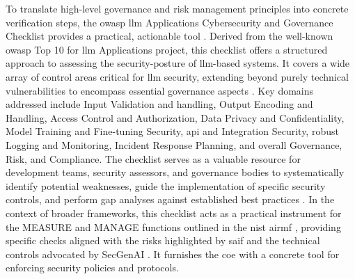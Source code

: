 To translate high-level governance and risk management principles into concrete verification steps, the \gls{owasp} \gls{llm} Applications Cybersecurity and Governance Checklist provides a practical, actionable tool \cite{editor_llm_nodate}. Derived from the well-known \gls{owasp} Top 10 for \gls{llm} Applications project, this checklist offers a structured approach to assessing the \gls{security-posture} of \gls{llm}-based systems. It covers a wide array of control areas critical for \gls{llm} security, extending beyond purely technical vulnerabilities to encompass essential governance aspects \cite{editor_llm_nodate}. Key domains addressed include Input Validation and handling, Output Encoding and Handling, Access Control and Authorization, Data Privacy and Confidentiality, Model Training and Fine-tuning Security, \gls{api} and Integration Security, robust Logging and Monitoring, Incident Response Planning, and overall Governance, Risk, and Compliance\cite{editor_llm_nodate}. The checklist serves as a valuable resource for development teams, security assessors, and governance bodies to systematically identify potential weaknesses, guide the implementation of specific security controls, and perform gap analyses against established best practices \cite{editor_llm_nodate}. In the context of broader frameworks, this checklist acts as a practical instrument for the MEASURE and MANAGE functions outlined in the \gls{nist} \gls{airmf} \cite{tabassi_artificial_2023}, providing specific checks aligned with the risks highlighted by \gls{saif} \cite{hansen_introducing_2023} and the technical controls advocated by SecGenAI \cite{haryanto_secgenai_2024}. It furnishes the \gls{coe}\cite{editor_llm_nodate} with a concrete tool for enforcing security policies and protocols.
